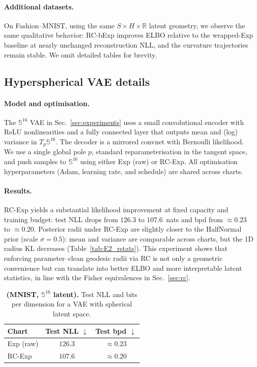 \documentclass{article}
\theoremstyle{definition}
\theoremstyle{remark}
\newcommand{\SSS}{\mathbb{S}}
\begin{document}
\paragraph{Additional datasets.}
On Fashion--MNIST, using the same $S \times H \times \mathbb{R}$ latent geometry, we observe
the same qualitative behavior: RC-bExp improves ELBO relative to the wrapped-Exp baseline
at nearly unchanged reconstruction NLL, and the curvature trajectories remain stable.
We omit detailed tables for brevity.

\subsection*{Hyperspherical VAE details}
\label{app:E2_details}

\paragraph{Model and optimisation.}
The $\SSS^{16}$ VAE in Sec.~\ref{sec:experiments} uses a small convolutional encoder with ReLU
nonlinearities and a fully connected layer that outputs mean and (log) variance in
$T_p \SSS^{16}$.
The decoder is a mirrored convnet with Bernoulli likelihood.
We use a single global pole $p$, standard reparameterisation in the tangent space, and push
samples to $\SSS^{16}$ using either Exp (raw) or RC-Exp.
All optimisation hyperparameters (Adam, learning rate, and schedule) are shared across charts.



\paragraph{Results.}
RC-Exp yields a substantial likelihood improvement at fixed capacity and
training budget:
test NLL drops from $126.3$ to $107.6$~nats and bpd from
$\approx 0.23$ to $\approx 0.20$.
Posterior radii under RC-Exp are slightly closer to the HalfNormal prior
(scale $\sigma=0.5$): mean and variance are comparable across charts,
but the 1D radius KL decreases (Table~\ref{tab:E2_rstats}).
This experiment shows that enforcing parameter--clean geodesic radii via
RC is not only a geometric convenience but can translate into better ELBO
and more interpretable latent statistics, in line with the Fisher
equivalences in Sec.~\ref{sec:rc}.

\begin{table}[H]
  \centering
  \caption{\textbf{(MNIST, $\SSS^{16}$ latent).}
  Test NLL and bits per dimension for a VAE with spherical latent space.}
  \label{tab:E2_mnist}
  \begin{tabular}{lcc}
    \toprule
    Chart & Test NLL $\downarrow$ & Test bpd $\downarrow$ \\
    \midrule
    Exp (raw) & $126.3$ & $\approx 0.23$ \\
    RC-Exp   & $107.6$ & $\approx 0.20$ \\
    \bottomrule
  \end{tabular}
\end{table}
\end{document}
